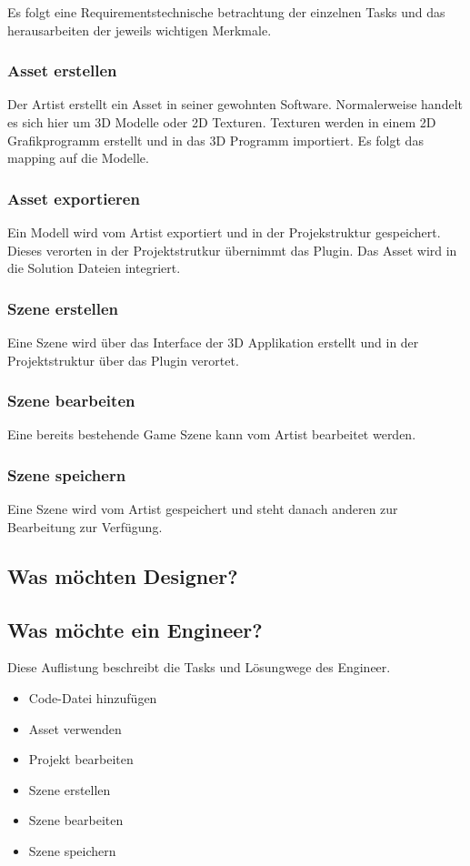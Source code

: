 \documentclass[pagesize, paper=a4, fontsize=12pt,titlepage=true, headings=small, headnosepline, abstractoff, liststotoc, nochapterprefix, plainheadsepline, twoside]{scrreprt}
\begin{document}
Es folgt eine Requirementstechnische betrachtung der einzelnen Tasks und das herausarbeiten der jeweils wichtigen Merkmale.

\subsubsection{Asset erstellen}
Der Artist erstellt ein Asset in seiner gewohnten Software. Normalerweise handelt es sich hier um 3D Modelle oder 2D Texturen. Texturen werden in einem 2D Grafikprogramm erstellt und  in das 3D Programm importiert. Es folgt das mapping auf die Modelle.

\subsubsection{Asset exportieren}
Ein Modell wird vom Artist exportiert und in der Projekstruktur gespeichert. Dieses verorten in der Projektstrutkur übernimmt das Plugin. Das Asset wird in die Solution Dateien integriert.

\subsubsection{Szene erstellen}
Eine Szene wird über das Interface der 3D Applikation erstellt und in der Projektstruktur über das Plugin verortet.

\subsubsection{Szene bearbeiten}
Eine bereits bestehende Game Szene kann vom Artist bearbeitet werden.

\subsubsection{Szene speichern}
Eine Szene wird vom Artist gespeichert und steht danach anderen zur Bearbeitung zur Verfügung.

\subsection{Was möchten Designer?}

\subsection{Was möchte ein Engineer?}
Diese Auflistung beschreibt die Tasks und Lösungwege des Engineer.
\begin{itemize}
\item Code-Datei hinzufügen
\item Asset verwenden
\item Projekt bearbeiten
\item Szene erstellen
\item Szene bearbeiten
\item Szene speichern
\end{itemize}
\end{document}
